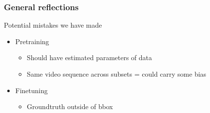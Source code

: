\documentclass{beamer}
\begin{document}
\begin{frame}
    \frametitle{General reflections}
    Potential mistakes we have made
    \begin{itemize}
        \item<1-> Pretraining
        \begin{itemize}
            \item<1-> Should have estimated parameters of data
            \item<2-> Same video sequence across subsets = could carry some bias
        \end{itemize}
        \item<3-> Finetuning
        \begin{itemize}
            \item<3-> Groundtruth outside of bbox 
        \end{itemize}
    \end{itemize}
\end{frame}
\end{document}
